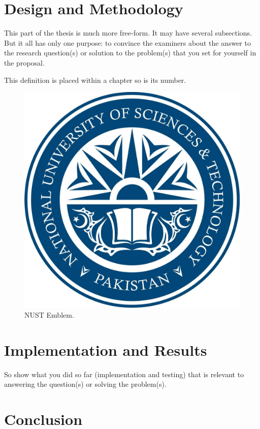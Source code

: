 \documentclass[12pt,a4paper,oneside]{book} %
\begin{document}
\chapter{Design and Methodology}
\label{c-methods}

This part of the thesis is much more free-form. It may have several
subsections. But it all has only one purpose: to convince the examiners
about the answer to the research question(s) or solution to the problem(s) that
you set for yourself in the proposal.

\begin{definition}[Testing 1,2,3]
This definition is placed within a chapter so is its number.
\end{definition}

\begin{figure}[htp]
\begin{center}
  \includegraphics[width=0.7\columnwidth]{nust.jpg}
  \caption{NUST Emblem.}
  \label{f-nust}
\end{center}
\end{figure}


\chapter{Implementation and Results}
\label{c-results}

So show what you did so far (implementation and testing) that is relevant to
answering the question(s) or solving the problem(s).



\chapter{Conclusion}
\label{c-conclusion}
\end{document}
